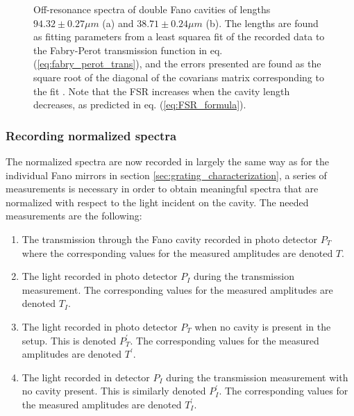 \begin{figure}[h!]
\begin{subfigure}[b]{0.49\textwidth}
        \caption{}
        \label{fig:40um_FSR}
    \end{subfigure}
    \caption{Off-resonance spectra of double Fano cavities of lengths $94.32 \pm 0.27 \mu m$ (a) and $38.71 \pm 0.24 \mu m$ (b). The lengths are found as fitting parameters from a least squarea fit of the recorded data to the Fabry-Perot transmission function in eq. (\ref{eq:fabry_perot_trans}), and the errors presented are found as the square root of the diagonal of the covarians matrix corresponding to the fit \cite{Hughes}. Note that the FSR increases when the cavity length decreases, as predicted in eq. (\ref{eq:FSR_formula}).}
    \label{fig:length_from_long_scan_example}    
\end{figure}


\subsubsection{Recording normalized spectra}

The normalized spectra are now recorded in largely the same way as for the individual Fano mirrors in section \ref{sec:grating_characterization}, a series of measurements is necessary in order to obtain meaningful spectra that are normalized with respect to the light incident on the cavity. The needed measurements are the following: 
\begin{enumerate}
    \item The transmission through the Fano cavity recorded in photo detector $P_T$ where the corresponding values for the measured amplitudes are denoted $T$.
    \item The light recorded in photo detector $P_I$ during the transmission measurement. The corresponding values for the measured amplitudes are denoted $T_I$.
    \item The light recorded in photo detector $P_T$ when no cavity is present in the setup. This is denoted $P_T^{\prime}$. The corresponding values for the measured amplitudes are denoted $T^{\prime}$.
    \item The light recorded in detector $P_I$ during the transmission measurement with no cavity present. This is similarly denoted $P_I^{\prime}$. The corresponding values for the measured amplitudes are denoted $T_I^{\prime}$.
\end{enumerate}

